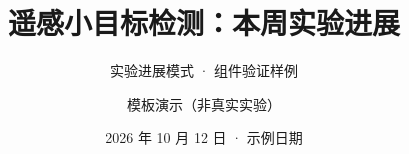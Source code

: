 \title[实验模式演示]{遥感小目标检测：本周实验进展}
\subtitle{实验进展模式 · 组件验证样例}
\author{模板演示（非真实实验）}
\date{2026 年 10 月 12 日 · 示例日期}
\renewcommand{\ReportStatus}{模板演示：全部数字与图像为合成数据}
